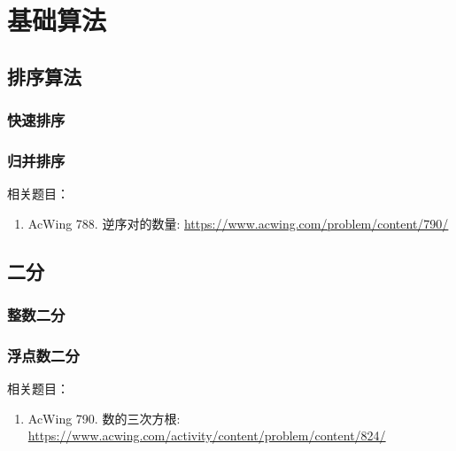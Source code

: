 \chapter{基础算法}

\begin{center}
\end{center}

\section{排序算法}
\subsection{快速排序}


\subsection{归并排序}


\ifshowLink
相关题目：
    \begin{enumerate}
        \item AcWing 788. 逆序对的数量: \href{https://www.acwing.com/problem/content/790/}{https://www.acwing.com/problem/content/790/}
    \end{enumerate}
\fi

\section{二分}
\subsection{整数二分}


\subsection{浮点数二分}


\ifshowLink
相关题目：
    \begin{enumerate}
        \item AcWing 790. 数的三次方根: \href{https://www.acwing.com/activity/content/problem/content/824/}{https://www.acwing.com/activity/content/problem/content/824/}
    \end{enumerate}
\fi


